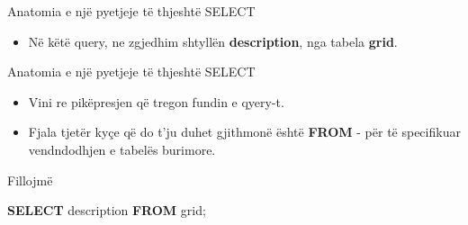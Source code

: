 \documentclass[
  ignorenonframetext,
]{beamer}
\newenvironment{Shaded}{\begin{snugshade}}{\end{snugshade}}
\newcommand{\KeywordTok}[1]{\textcolor[rgb]{0.13,0.29,0.53}{\textbf{#1}}}
\newcommand{\NormalTok}[1]{#1}
\providecommand{\tightlist}{%
  \setlength{\itemsep}{0pt}\setlength{\parskip}{0pt}}
\begin{document}
\begin{frame}{Anatomia e një pyetjeje të thjeshtë SELECT}
\label{anatomia-e-njuxeb-pyetjeje-tuxeb-thjeshtuxeb-select-1}
\begin{itemize}
\tightlist
\item
  Në këtë query, ne zgjedhim shtyllën \textbf{description}, nga tabela
  \textbf{grid}.
\end{itemize}
\end{frame}

\begin{frame}{Anatomia e një pyetjeje të thjeshtë SELECT}
\label{anatomia-e-njuxeb-pyetjeje-tuxeb-thjeshtuxeb-select-2}
\begin{itemize}
\item
  Vini re pikëpresjen që tregon fundin e qyery-t.
\item
  Fjala tjetër kyçe që do t'ju duhet gjithmonë është \textbf{FROM} - për
  të specifikuar vendndodhjen e tabelës burimore.
\end{itemize}
\end{frame}

\begin{frame}[fragile]{Fillojmë}
\label{fillojmuxeb-1}

\begin{Shaded}
\begin{Highlighting}[]
\KeywordTok{SELECT}\NormalTok{ description}
\KeywordTok{FROM}\NormalTok{ grid;}
\end{Highlighting}
\end{Shaded}
\end{frame}
\end{document}
